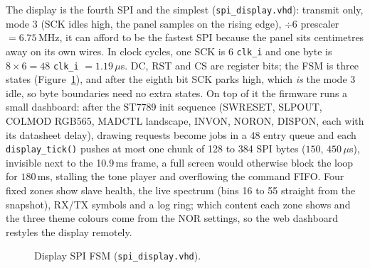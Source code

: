 \documentclass[a4paper,10pt]{article}
\begin{document}
The display is the fourth SPI and the simplest (\texttt{spi\_display.vhd}): transmit
only, mode 3 (SCK idles high, the panel samples on the rising edge), $\div6$
prescaler $=6.75$\,MHz, it can afford to be the fastest SPI because the panel
sits centimetres away on its own wires. In clock cycles, one SCK is 6 \texttt{clk\_i} and
one byte is $8\times6 = 48$ \texttt{clk\_i} $= 1.19\,\mu$s. DC, RST and CS are register
bits; the FSM is three states (Figure~\ref{fig:disp-fsm}), and after the eighth bit SCK
parks high, which \emph{is} the mode 3 idle, so byte boundaries need no extra
states. On top of it the firmware runs a small dashboard: after the ST7789 init
sequence (SWRESET, SLPOUT, COLMOD RGB565, MADCTL landscape, INVON, NORON, DISPON,
each with its datasheet delay), drawing requests become jobs in a 48 entry queue and
each \texttt{display\_tick()} pushes at most one chunk of 128 to 384 SPI bytes
($150$, $450\,\mu$s), invisible next to the 10.9\,ms frame, a full screen would
otherwise block the loop for $180$\,ms, stalling the tone player and
overflowing the command FIFO. Four fixed zones show slave health, the live spectrum
(bins 16 to 55 straight from the snapshot), RX/TX symbols and a log ring; which
content each zone shows and the three theme colours come from the NOR settings, so
the web dashboard restyles the display remotely.

\begin{figure}[H]
\centering
{}
\caption{Display SPI FSM (\texttt{spi\_display.vhd}).}
\label{fig:disp-fsm}
\end{figure}
\end{document}
